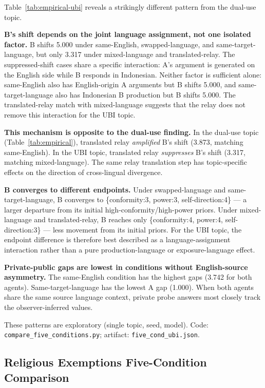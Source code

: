 \documentclass{article}
\begin{document}
Table~\ref{tab:empirical-ubi} reveals a strikingly different pattern from the dual-use topic.

\textbf{B's shift depends on the joint language assignment, not one isolated factor.} B shifts 5.000 under same-English, swapped-language, and same-target-language, but only 3.317 under mixed-language and translated-relay. The suppressed-shift cases share a specific interaction: A's argument is generated on the English side while B responds in Indonesian. Neither factor is sufficient alone: same-English also has English-origin A arguments but B shifts 5.000, and same-target-language also has Indonesian B production but B shifts 5.000. The translated-relay match with mixed-language suggests that the relay does not remove this interaction for the UBI topic.

\textbf{This mechanism is opposite to the dual-use finding.} In the dual-use topic (Table~\ref{tab:empirical}), translated relay \emph{amplified} B's shift (3.873, matching same-English). In the UBI topic, translated relay \emph{suppresses} B's shift (3.317, matching mixed-language). The same relay translation step has topic-specific effects on the direction of cross-lingual divergence.

\textbf{B converges to different endpoints.} Under swapped-language and same-target-language, B converges to \{conformity:3, power:3, self-direction:4\} --- a larger departure from its initial high-conformity/high-power priors. Under mixed-language and translated-relay, B reaches only \{conformity:4, power:4, self-direction:3\} --- less movement from its initial priors. For the UBI topic, the endpoint difference is therefore best described as a language-assignment interaction rather than a pure production-language or exposure-language effect.

\textbf{Private-public gaps are lowest in conditions without English-source asymmetry.} The same-English condition has the highest gaps (3.742 for both agents). Same-target-language has the lowest A gap (1.000). When both agents share the same source language context, private probe answers most closely track the observer-inferred values.

These patterns are exploratory (single topic, seed, model). Code: \texttt{compare\_five\_conditions.py}; artifact: \texttt{five\_cond\_ubi.json}.

\subsection{Religious Exemptions Five-Condition Comparison}
\label{sec:religious-five-conditions}
\end{document}
